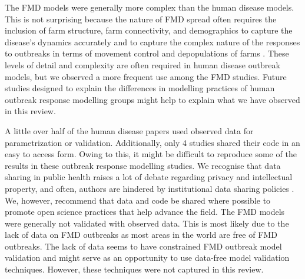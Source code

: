 \documentclass[10pt,letterpaper]{article}
\begin{document}
The FMD models were generally more complex than the human disease models. This is not surprising because the nature of FMD spread often requires the inclusion of farm structure, farm connectivity, and demographics to capture the disease's dynamics accurately and to capture the complex nature of the responses to outbreaks in terms of movement control and depopulations of farms \cite{Kinsley2018}. These levels of detail and complexity are often required in human disease outbreak models, but we observed a more frequent use among the FMD studies. Future studies designed to explain the differences in modelling practices of human outbreak response modelling groups might help to explain what we have observed in this review.

A little over half of the human disease papers used observed data for parametrization or validation. Additionally, only 4 studies shared their code in an easy to access form. Owing to this, it might be difficult to reproduce some of the results in these outbreak response modelling studies. We recognise that data sharing in public health raises a lot of debate regarding privacy and intellectual property, and often, authors are hindered by institutional data sharing policies \cite{Kim2016}. We, however, recommend that data and code be shared where possible to promote open science practices that help advance the field.  The FMD models were generally not validated with observed data. This is most likely due to the lack of data on FMD outbreaks as most areas in the world are free of FMD outbreaks. The lack of data seems to have constrained FMD outbreak model validation and might serve as an opportunity to use data-free model validation techniques. However, these techniques were not captured in this review.
\end{document}
